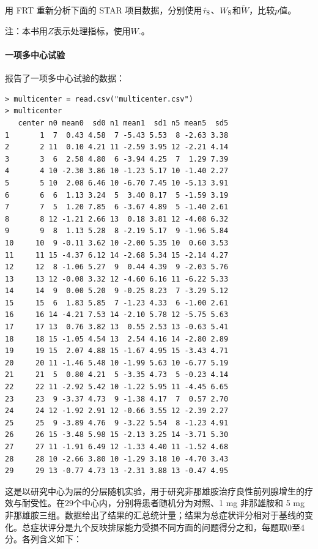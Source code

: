 用 FRT 重新分析下面的 STAR 项目数据，分别使用$\hat{\tau}_\textsc{S}$、$W_\textsc{S}$和$\tilde W$，比较$p$值。

注：本书用$Z$表示处理指标，\citet{imbens2015causal}使用$W.$。
 






\paragraph{一项多中心试验}

\citet[][Table 1]{gould1998multi}报告了一项多中心试验的数据：

\begin{lstlisting}
> multicenter = read.csv("multicenter.csv")
> multicenter
   center n0 mean0  sd0 n1 mean1  sd1 n5 mean5  sd5
1       1  7  0.43 4.58  7 -5.43 5.53  8 -2.63 3.38
2       2 11  0.10 4.21 11 -2.59 3.95 12 -2.21 4.14
3       3  6  2.58 4.80  6 -3.94 4.25  7  1.29 7.39
4       4 10 -2.30 3.86 10 -1.23 5.17 10 -1.40 2.27
5       5 10  2.08 6.46 10 -6.70 7.45 10 -5.13 3.91
6       6  6  1.13 3.24  5  3.40 8.17  5 -1.59 3.19
7       7  5  1.20 7.85  6 -3.67 4.89  5 -1.40 2.61
8       8 12 -1.21 2.66 13  0.18 3.81 12 -4.08 6.32
9       9  8  1.13 5.28  8 -2.19 5.17  9 -1.96 5.84
10     10  9 -0.11 3.62 10 -2.00 5.35 10  0.60 3.53
11     11 15 -4.37 6.12 14 -2.68 5.34 15 -2.14 4.27
12     12  8 -1.06 5.27  9  0.44 4.39  9 -2.03 5.76
13     13 12 -0.08 3.32 12 -4.60 6.16 11 -6.22 5.33
14     14  9  0.00 5.20  9 -0.25 8.23  7 -3.29 5.12
15     15  6  1.83 5.85  7 -1.23 4.33  6 -1.00 2.61
16     16 14 -4.21 7.53 14 -2.10 5.78 12 -5.75 5.63
17     17 13  0.76 3.82 13  0.55 2.53 13 -0.63 5.41
18     18 15 -1.05 4.54 13  2.54 4.16 14 -2.80 2.89
19     19 15  2.07 4.88 15 -1.67 4.95 15 -3.43 4.71
20     20 11 -1.46 5.48 10 -1.99 5.63 10 -6.77 5.19
21     21  5  0.80 4.21  5 -3.35 4.73  5 -0.23 4.14
22     22 11 -2.92 5.42 10 -1.22 5.95 11 -4.45 6.65
23     23  9 -3.37 4.73  9 -1.38 4.17  7  0.57 2.70
24     24 12 -1.92 2.91 12 -0.66 3.55 12 -2.39 2.27
25     25  9 -3.89 4.76  9 -3.22 5.54  8 -1.23 4.91
26     26 15 -3.48 5.98 15 -2.13 3.25 14 -3.71 5.30
27     27 11 -1.91 6.49 12 -1.33 4.40 11 -1.52 4.68
28     28 10 -2.66 3.80 10 -1.29 3.18 10 -4.70 3.43
29     29 13 -0.77 4.73 13 -2.31 3.88 13 -0.47 4.95
\end{lstlisting}


这是以研究中心为层的分层随机实验，用于研究非那雄胺治疗良性前列腺增生的疗效与耐受性。在$29$个中心内，分别将患者随机分为对照、1 mg 非那雄胺和 5 mg 非那雄胺三组。数据给出了结果的汇总统计量；结果为总症状评分相对于基线的变化。总症状评分是九个反映排尿能力受损不同方面的问题得分之和，每题取$0$至$4$分。各列含义如下：

